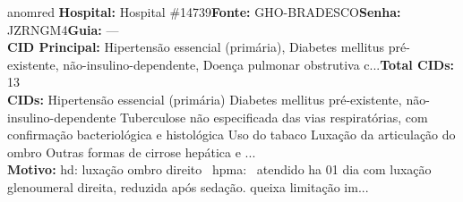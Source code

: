 \documentclass[a4paper,10pt]{article}
\begin{document}
\begin{anomalycard}[Interna\c{c}\~{a}o \#118690 | Pac. \#92761 | CR\'{I}TICO (z=5.28) | LOS: 5d | 25/02/2026\,$\to$\,02/03/2026]{anomred}
\textbf{Hospital:} Hospital \#14739\quad \textbf{Fonte:} GHO-BRADESCO\quad \textbf{Senha:} JZRNGM4\quad \textbf{Guia:} ---\\

\textbf{CID Principal:} {\small Hipertensão essencial (primária), Diabetes mellitus pré-existente, não-insulino-dependente, Doença pulmonar obstrutiva c...}\quad\textbf{Total CIDs:} 13\\

\textbf{CIDs:} {\scriptsize Hipertensão essencial (primária) \textbar{} Diabetes mellitus pré-existente, não-insulino-dependente \textbar{} Tuberculose não especificada das vias respiratórias, com confirmação bacteriológica e histológica \textbar{} Uso do tabaco \textbar{} Luxação da articulação do ombro \textbar{} Outras formas de cirrose hepática e ...}\\

\textbf{Motivo:} {\scriptsize hd: luxação ombro direito  hpma:  atendido ha 01 dia com luxação glenoumeral direita, reduzida após sedação. queixa limitação im...}\\




\end{anomalycard}
\end{document}
